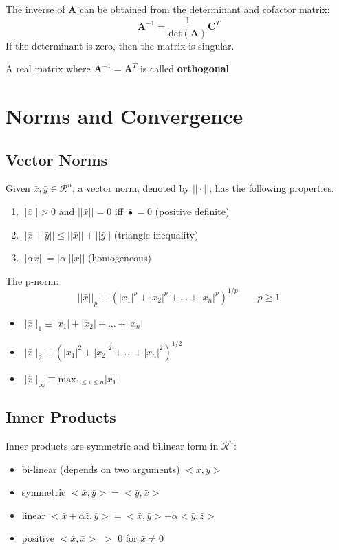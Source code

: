 \documentclass[12pt]{article}
\newcommand{\ve}[1]{\ensuremath{\mathbf{#1}}}
\begin{document}
The inverse of $\ve{A}$ can be obtained from the determinant and cofactor matrix:
%
\begin{equation}
\ve{A}^{-1} = \frac{1}{\text{det}(\ve{A})}\ve{C}^T \nonumber
\end{equation}
%
If the determinant is zero, then the matrix is singular.

A real matrix where $\ve{A}^{-1} = \ve{A}^T$ is called \textbf{orthogonal}


\section{Norms and Convergence}
\subsection{Vector Norms}
Given $\bar{x}, \bar{y} \in \mathcal{R}^n$, a vector norm, denoted by $|| \cdot ||$, has the following properties:
%
\begin{enumerate}
\item $||\bar{x}|| > 0$ and $||\bar{x}|| = 0$ iff $\bar{•} = 0$ (positive definite)
\item $||\bar{x} + \bar{y}|| \leq ||\bar{x}|| + ||\bar{y}||$ (triangle inequality)
\item $||\alpha \bar{x}|| = |\alpha| ||\bar{x}||$ (homogeneous)
\end{enumerate}

The p-norm:
%
\begin{equation}
||\bar{x}||_p \equiv (|x_1|^p + |x_2|^p + \dots + |x_n|^p)^{1/p} \qquad p \geq 1 \nonumber
\end{equation}
%
\begin{itemize}
\item $||\bar{x}||_1 \equiv |x_1| + |x_2| + \dots + |x_n|$
\item $||\bar{x}||_2 \equiv (|x_1|^2 + |x_2|^2 + \dots + |x_n|^2)^{1/2}$
\item $||\bar{x}||_{\infty} \equiv \displaystyle\text{max}_{1 \leq i \leq n} |x_1|$
\end{itemize}

\subsection{Inner Products}
Inner products are symmetric and bilinear form in $\mathcal{R}^n$:
%
\begin{itemize}
\item bi-linear (depends on two arguments) $< \bar{x}, \bar{y} >$
\item symmetric $< \bar{x}, \bar{y} > = < \bar{y}, \bar{x} >$
\item linear $< \bar{x} + \alpha \bar{z}, \bar{y} > = < \bar{x}, \bar{y} > + \alpha < \bar{y}, \bar{z} >$
\item positive $< \bar{x}, \bar{x} >$ $>$ 0 for $\bar{x} \neq 0$
\end{itemize}
\end{document}
